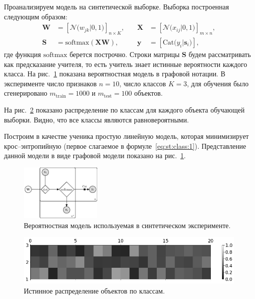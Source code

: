 Проанализируем модель на синтетической выборке. Выборка построенная следующим образом:
\[
\begin{aligned}
\mathbf{W} &= \left[\mathcal{N}\bigr(w_{jk}|0, 1\bigr)\right]_{n\times K}, \quad &\mathbf{X} &= \left[\mathcal{N}\bigr(x_{ij}|0, 1\bigr)\right]_{m\times n}, \\
 \mathbf{S} &= \text{softmax}\left(\mathbf{XW}\right), \quad &\mathbf{y} &= \left[\text{Cat}\bigr(y_i| \mathbf{s}_i\bigr)\right],
\end{aligned}
\]
где функция $\text{softmax}$ берется построчно. Строки матрицы $\mathbf{S}$ будем рассматривать как предсказание учителя, то есть учитель знает истинные вероятности каждого класса. На рис.~\ref{fg:ex:synt:plate} показана вероятностная модель в графовой нотации. В эксперименте число признаков $n=10$, число классов $K=3$, для обучения было сгенерировано $m_{\text{train}}=1000$ и $m_{\text{test}}=100$ объектов.

На рис.~\ref{fg:ex:synt:distr:real} показано распределение по классам для каждого объекта обучающей выборки. Видно, что все классы являются равновероятными.

Построим в качестве ученика простую линейную модель, которая минимизирует крос--энтропийную (первое слагаемое в формуле~\eqref{eq:st:class:1}). Представление данной модели в виде графовой модели показано на рис.~\ref{fg:ex:synt:plate}.

\begin{figure}[h!t]\center
\includegraphics[width=0.35\textwidth]{results/privlearn/linear_model}
\caption{Вероятностная модель используемая в синтетическом эксперименте.}
\label{fg:ex:synt:plate}
\end{figure}

\begin{figure}[h!t]\center
\includegraphics[width=1\textwidth]{results/privlearn/syn_real_distr}
\caption{Истинное распределение  объектов по классам.}
\label{fg:ex:synt:distr:real}
\end{figure}


